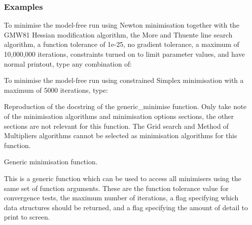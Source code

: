 \subsubsection{Examples}

To minimise the model-free run 
 using Newton minimisation together with the GMW81
Hessian modification algorithm, the More and Thuente line search algorithm, a function
tolerance of 1e-25, no gradient tolerance, a maximum of 10,000,000 iterations, constraints
turned on to limit parameter values, and have normal printout, type any combination of:













To minimise the model-free run 
 using constrained Simplex minimisation with a maximum of
5000 iterations, type:






Reproduction of the docstring of the generic\_minimise function.  Only take note of the
minimisation algorithms and minimisation options sections, the other sections are not
relevant for this function.  The Grid search and Method of Multipliers algorithms cannot be
selected as minimisation algorithms for this function.


Generic minimisation function.

This is a generic function which can be used to access all minimisers using the same set of
function arguments.  These are the function tolerance value for convergence tests, the maximum
number of iterations, a flag specifying which data structures should be returned, and a flag
specifying the amount of detail to print to screen.


